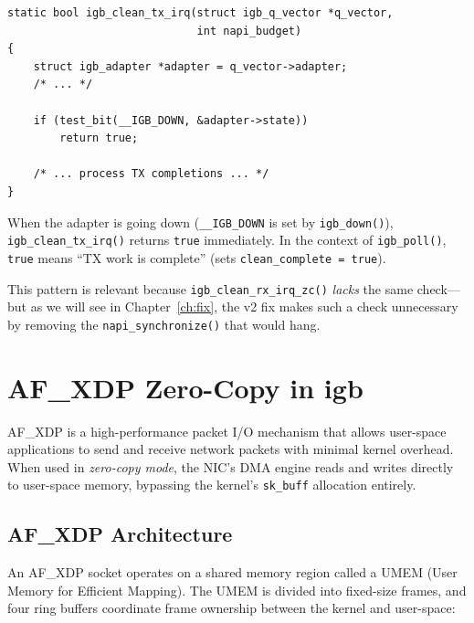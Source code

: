 \documentclass[11pt,a4paper,openany]{book}
\newcommand{\func}[1]{\texttt{#1()}}
\newcommand{\flag}[1]{\texttt{#1}}
\begin{document}
\begin{lstlisting}[caption={\texttt{\_\_IGB\_DOWN} check in \texttt{igb\_clean\_tx\_irq()} (igb\_main.c:8344)},
    label=lst:tx-irq-down-check]
static bool igb_clean_tx_irq(struct igb_q_vector *q_vector,
                             int napi_budget)
{
    struct igb_adapter *adapter = q_vector->adapter;
    /* ... */

    if (test_bit(__IGB_DOWN, &adapter->state))
        return true;

    /* ... process TX completions ... */
}
\end{lstlisting}

When the adapter is going down (\flag{\_\_IGB\_DOWN} is set by
\func{igb\_down}), \func{igb\_clean\_tx\_irq} returns \texttt{true}
immediately.  In the context of \func{igb\_poll}, \texttt{true} means
``TX work is complete'' (sets \texttt{clean\_complete = true}).

This pattern is relevant because \func{igb\_clean\_rx\_irq\_zc}
\emph{lacks} the same check---but as we will see in
Chapter~\ref{ch:fix}, the v2 fix makes such a check unnecessary by
removing the \func{napi\_synchronize} that would hang.


\chapter{AF\_XDP Zero-Copy in igb}
\label{ch:afxdp}

AF\_XDP is a high-performance packet I/O mechanism that allows
user-space applications to send and receive network packets with minimal
kernel overhead.  When used in \emph{zero-copy mode}, the NIC's DMA
engine reads and writes directly to user-space memory, bypassing the
kernel's \texttt{sk\_buff} allocation entirely.

\section{AF\_XDP Architecture}

An AF\_XDP socket operates on a shared memory region called a UMEM
(User Memory for Efficient Mapping).  The UMEM is divided into
fixed-size frames, and four ring buffers coordinate frame ownership
between the kernel and user-space:
\end{document}
